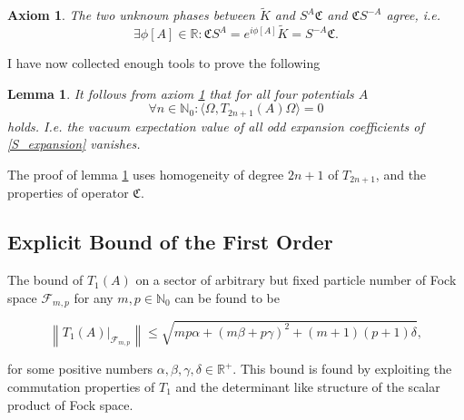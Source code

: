 \documentclass[b5paper,draft,openbib,12pt]{memoir}
\newtheorem{axiom}{Axiom}
\newtheorem{lemma}{Lemma}
\begin{document}
\begin{axiom}\label{SC_CS} The two unknown phases between \(\tilde{K}\) and \(S^A \mathfrak{C}\) and \(\mathfrak{C}S^{-A}\) agree, i.e.
\begin{equation}
    \exists \phi[A]\in\mathbb R:  \mathfrak{C}S^A=e^{i\phi[A]} \tilde{K}=S^{-A} \mathfrak{C}.
\end{equation}
\end{axiom}
I have now collected enough tools to prove the following
\begin{lemma}\label{vacuum_expectation_odd}
It follows from axiom \ref{SC_CS} that for all four potentials \(A\)
\begin{equation}
\forall n\in\mathbb{N}_0: \langle \Omega, T_{2n+1}(A) \Omega \rangle=0
\end{equation}
holds. I.e. the vacuum expectation value of all odd expansion coefficients of \eqref{S_expansion} vanishes.
\end{lemma}
The proof of lemma \ref{vacuum_expectation_odd} uses homogeneity of degree
\(2n+1\) of \(T_{2n+1}\), and the properties of operator \(\mathfrak{C}\).

\subsection{ Explicit Bound of the First Order}\label{sec: first order}
 The bound of \(T_1(A)\) on a sector of arbitrary but fixed particle number of Fock space \(\mathcal{F}_{m,p}\) for any \(m,p\in\mathbb{N}_0\) can be found to be

\begin{equation}
\left\|  T_1(A)\Big|_{\mathcal{F}_{m,p}}\right\|\le  \sqrt{m p \alpha +(m \beta +p \gamma)^2+(m+1) (p+1) \delta},
\end{equation}
 
 for some positive numbers \(\alpha,\beta,\gamma,\delta \in \mathbb{R}^+\). This bound is found by exploiting the commutation properties of \(T_1\) and the determinant like structure of the scalar product of Fock space.
\end{document}
